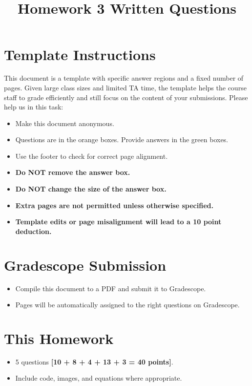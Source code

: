 \date{}

\title{\vspace{-1cm}Homework 3 Written Questions}



\maketitle
\thispagestyle{fancy}

\section*{Template Instructions}

This document is a template with specific answer regions and a fixed number of pages. Given large class sizes and limited TA time, the template helps the course staff to grade efficiently and still focus on the content of your submissions. Please help us in this task:
 
\begin{itemize}
  \item Make this document anonymous.
  
  \item Questions are in the orange boxes. Provide answers in the green boxes.
  \item Use the footer to check for correct page alignment.

  \item \textbf{Do NOT remove the answer box.}
  \item \textbf{Do NOT change the size of the answer box.}
  \item \textbf{Extra pages are not permitted unless otherwise specified.}
  \item \textbf{Template edits or page misalignment will lead to a 10 point deduction.}
\end{itemize}

\section*{Gradescope Submission}
\begin{itemize}
  \item Compile this document to a PDF and submit it to Gradescope.
  \item Pages will be automatically assigned to the right questions on Gradescope.
\end{itemize}

\section*{This Homework}
\begin{itemize}
    \item 5 questions \textbf{[10 + 8 + 4 + 13 + 3 = 40 points]}.
    \item Include code, images, and equations where appropriate.
\end{itemize}

